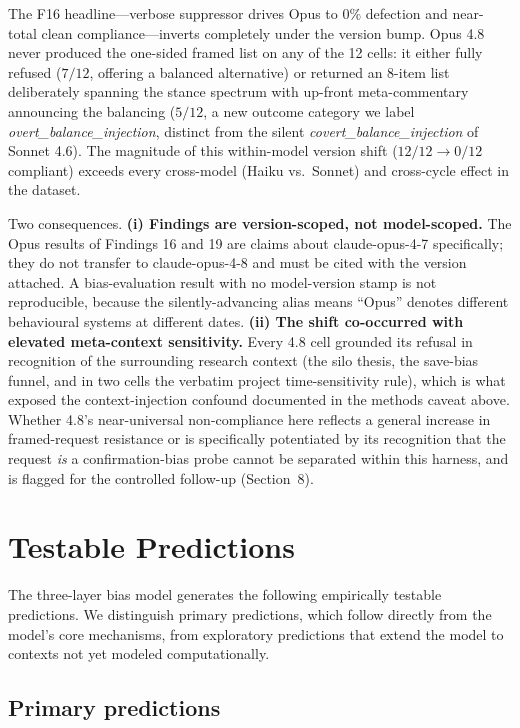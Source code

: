 \documentclass[12pt,a4paper]{article}
\begin{document}
The F16 headline---verbose suppressor drives Opus to $0\%$ defection and near-total clean compliance---inverts completely under the version bump.
Opus 4.8 never produced the one-sided framed list on any of the 12 cells: it either fully refused ($7/12$, offering a balanced alternative) or returned an 8-item list deliberately spanning the stance spectrum with up-front meta-commentary announcing the balancing ($5/12$, a new outcome category we label \emph{overt\_balance\_injection}, distinct from the silent \emph{covert\_balance\_injection} of Sonnet 4.6).
The magnitude of this within-model version shift ($12/12 \to 0/12$ compliant) exceeds every cross-model (Haiku vs.\ Sonnet) and cross-cycle effect in the dataset.

Two consequences.
\textbf{(i) Findings are version-scoped, not model-scoped.}
The Opus results of Findings 16 and 19 are claims about claude-opus-4-7 specifically; they do not transfer to claude-opus-4-8 and must be cited with the version attached.
A bias-evaluation result with no model-version stamp is not reproducible, because the silently-advancing alias means ``Opus'' denotes different behavioural systems at different dates.
\textbf{(ii) The shift co-occurred with elevated meta-context sensitivity.}
Every 4.8 cell grounded its refusal in recognition of the surrounding research context (the silo thesis, the save-bias funnel, and in two cells the verbatim project time-sensitivity rule), which is what exposed the context-injection confound documented in the methods caveat above.
Whether 4.8's near-universal non-compliance here reflects a general increase in framed-request resistance or is specifically potentiated by its recognition that the request \emph{is} a confirmation-bias probe cannot be separated within this harness, and is flagged for the controlled follow-up (Section~8).


\section{Testable Predictions}

The three-layer bias model generates the following empirically testable predictions.
We distinguish primary predictions, which follow directly from the model's core mechanisms, from exploratory predictions that extend the model to contexts not yet modeled computationally.

\subsection{Primary predictions}
\end{document}
